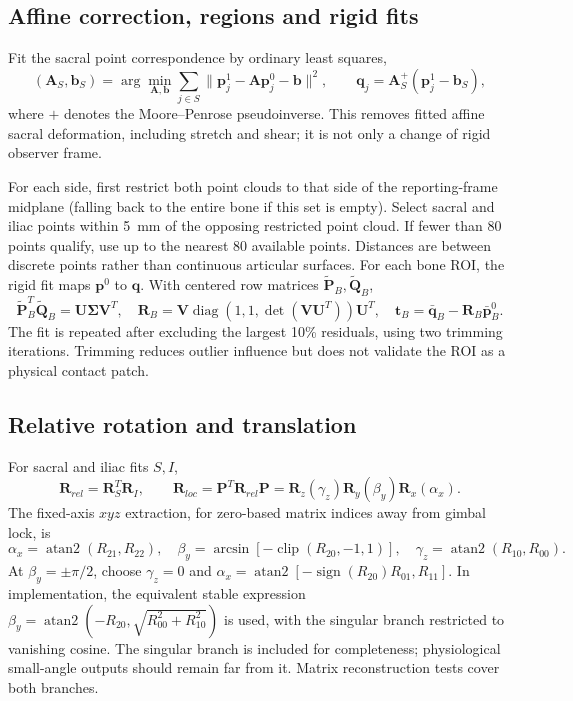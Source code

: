 \subsection{Affine correction, regions and rigid fits}
Fit the sacral point correspondence by ordinary least squares,
\begin{equation}
(\mathbf A_S,\mathbf b_S)=\arg\min_{\mathbf A,\mathbf b}\sum_{j\in S}
\|\mathbf p^1_j-\mathbf A\mathbf p^0_j-\mathbf b\|^2,
\qquad \mathbf q_j=\mathbf A_S^+(\mathbf p^1_j-\mathbf b_S),
\end{equation}
where $+$ denotes the Moore--Penrose pseudoinverse. This removes fitted affine sacral deformation, including stretch and shear; it is not only a change of rigid observer frame.

For each side, first restrict both point clouds to that side of the reporting-frame midplane (falling back to the entire bone if this set is empty). Select sacral and iliac points within 5~mm of the opposing restricted point cloud. If fewer than 80 points qualify, use up to the nearest 80 available points. Distances are between discrete points rather than continuous articular surfaces. For each bone ROI, the rigid fit maps $\mathbf p^0$ to $\mathbf q$. With centered row matrices $\widetilde{\mathbf P}_B,\widetilde{\mathbf Q}_B$,
\begin{equation}
\widetilde{\mathbf P}_B^T\widetilde{\mathbf Q}_B=\mathbf U\boldsymbol\Sigma\mathbf V^T,
\quad \mathbf R_B=\mathbf V\operatorname{diag}(1,1,\det(\mathbf V\mathbf U^T))\mathbf U^T,
\quad \mathbf t_B=\bar{\mathbf q}_B-\mathbf R_B\bar{\mathbf p}^0_B.
\end{equation}
The fit is repeated after excluding the largest 10\% residuals, using two trimming iterations. Trimming reduces outlier influence but does not validate the ROI as a physical contact patch.

\subsection{Relative rotation and translation}
For sacral and iliac fits $S,I$,
\begin{equation}
\mathbf R_{rel}=\mathbf R_S^T\mathbf R_I,\qquad
\mathbf R_{loc}=\mathbf P^T\mathbf R_{rel}\mathbf P
=\mathbf R_z(\gamma_z)\mathbf R_y(\beta_y)\mathbf R_x(\alpha_x).
\end{equation}
The fixed-axis $xyz$ extraction, for zero-based matrix indices away from gimbal lock, is
\begin{equation}
\alpha_x=\operatorname{atan2}(R_{21},R_{22}),\quad
\beta_y=\arcsin[-\operatorname{clip}(R_{20},-1,1)],\quad
\gamma_z=\operatorname{atan2}(R_{10},R_{00}).
\end{equation}
At $\beta_y=\pm\pi/2$, choose $\gamma_z=0$ and
$\alpha_x=\operatorname{atan2}[-\operatorname{sign}(R_{20})R_{01},R_{11}]$.
In implementation, the equivalent stable expression $\beta_y=\operatorname{atan2}(-R_{20},\sqrt{R_{00}^2+R_{10}^2})$ is used, with the singular branch restricted to vanishing cosine. The singular branch is included for completeness; physiological small-angle outputs should remain far from it. Matrix reconstruction tests cover both branches.

